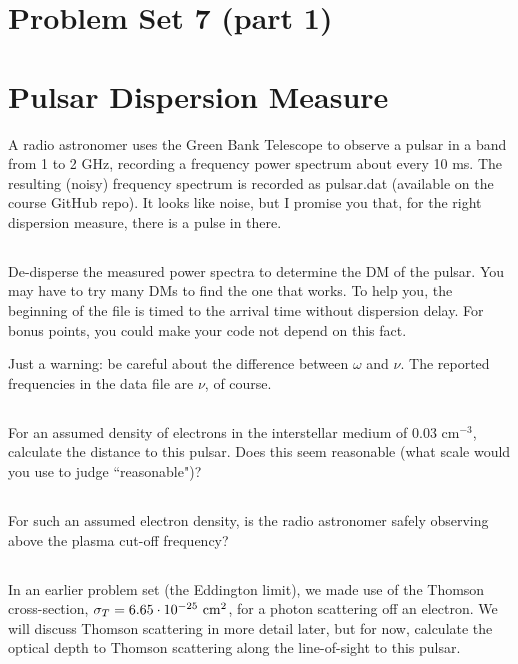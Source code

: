 \documentclass[11pt]{article}
\begin{document}
\pagestyle{empty}

\section*{\centering Problem Set 7 (part 1)}

\section{Pulsar Dispersion Measure}

A radio astronomer uses the Green Bank Telescope to observe a pulsar 
in a band from 1 to 2 GHz, recording a frequency power spectrum about every 10 ms.  The resulting
(noisy) frequency spectrum is recorded as pulsar.dat (available on the course GitHub repo).  It looks like 
noise, but
I promise you that, for the right dispersion measure, there is a pulse in there.

\subsection{}
De-disperse the measured power spectra to determine the 
DM of the pulsar.  You may have to try many DMs to find the one that works.
To help you, the beginning of the file is timed to the arrival time without dispersion delay.  For bonus
points, you could make your code not depend on this fact.

Just a warning: be careful about the difference between $\omega$ and $\nu$.  The reported frequencies in
the data file are $\nu$, of course.

\subsection{}
For an assumed density of electrons in the interstellar medium of 0.03 cm$^{-3}$, calculate the 
distance to this pulsar. Does this seem reasonable (what scale would you use to judge ``reasonable")?

\subsection{}
For such an assumed electron density, is the radio astronomer safely observing above the plasma cut-off frequency?

\subsection{}
In an earlier problem set (the Eddington limit), 
we made use of the Thomson cross-section, $\sigma_T=6.65\cdot10^{-25}~{\rm cm}^2$,
for a photon scattering off an electron. We will discuss Thomson scattering in more detail later, but
for now,
calculate the optical depth to Thomson scattering along the line-of-sight to this pulsar.
\end{document}
